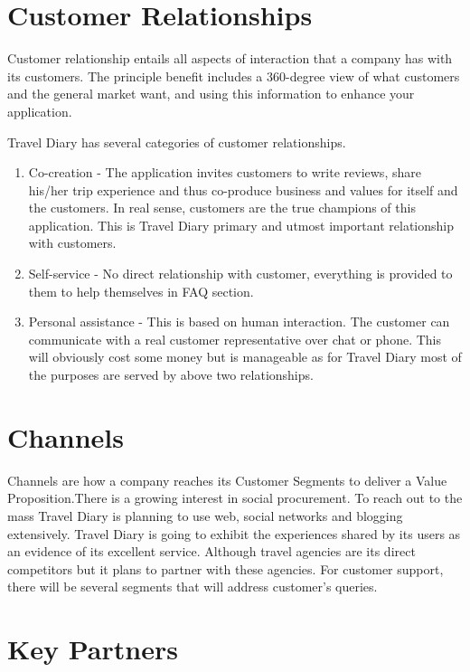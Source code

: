 \documentclass[IN,english]{tumbook}
\begin{document}
\section{Customer Relationships}


Customer relationship entails all aspects of interaction that a company has with its customers. The principle benefit includes a 360-degree view of what customers and the general market want, and using this information to enhance your application.

Travel Diary has several categories of customer relationships.

\begin{enumerate}
\item Co-creation - The application invites customers to write reviews, share his/her trip experience and thus co-produce business and values for itself and the customers. In real sense, customers are the true champions of this application. This is Travel Diary primary and utmost important relationship with customers.
\item Self-service - No direct relationship with customer, everything is provided to them to help themselves in FAQ section. 
\item Personal assistance - This is based on human interaction. The customer can communicate with a real customer representative over chat or phone. This will obviously cost some money but is manageable as for Travel Diary most of the purposes are served by above two relationships.
\end{enumerate}

\section{Channels}

Channels are how a company reaches its Customer Segments to deliver a Value Proposition.There is a growing interest in social procurement. To reach out to the mass Travel Diary is planning to use web, social networks and blogging extensively. Travel Diary is going to exhibit the experiences shared by its users as an evidence of its excellent service. Although travel agencies are its direct competitors but it plans to partner with these agencies. For customer support, there will be several segments that will address customer's queries.

\section{Key Partners}
\end{document}
